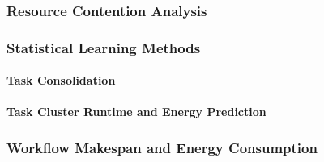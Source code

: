 \subsubsection{Resource Contention Analysis}
\label{sec:resource_contention_analysis}

\subsubsection{Statistical Learning Methods}
\label{sec:evaluation_statistical_learning_methods}

\paragraph{Task Consolidation}
\label{sec:evaluation_task_consolidation}

\paragraph{Task Cluster Runtime and Energy Prediction}
\label{sec:evaluation_task_cluster_runtime_and_energy_prediction}

\subsubsection{Workflow Makespan and Energy Consumption}
\label{sec:workflow_makespan_and_energy_consumption}
